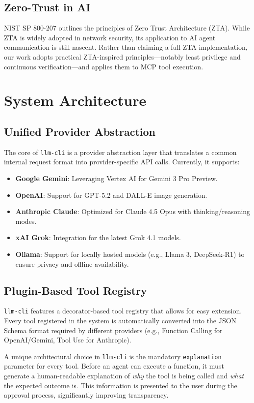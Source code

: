 \documentclass[conference]{IEEEtran}
\begin{document}
\subsection{Zero-Trust in AI}
NIST SP 800-207 \cite{nist} outlines the principles of Zero Trust Architecture (ZTA). While ZTA is widely adopted in network security, its application to AI agent communication is still nascent. Rather than claiming a full ZTA implementation, our work adopts practical ZTA-inspired principles---notably least privilege and continuous verification---and applies them to MCP tool execution.

\section{System Architecture}

\subsection{Unified Provider Abstraction}
The core of \texttt{llm-cli} is a provider abstraction layer that translates a common internal request format into provider-specific API calls. Currently, it supports:
\begin{itemize}
    \item \textbf{Google Gemini}: Leveraging Vertex AI for Gemini 3 Pro Preview.
    \item \textbf{OpenAI}: Support for GPT-5.2 and DALL-E image generation.
    \item \textbf{Anthropic Claude}: Optimized for Claude 4.5 Opus with thinking/reasoning modes.
    \item \textbf{xAI Grok}: Integration for the latest Grok 4.1 models.
    \item \textbf{Ollama}: Support for locally hosted models (e.g., Llama 3, DeepSeek-R1) to ensure privacy and offline availability.
\end{itemize}

\subsection{Plugin-Based Tool Registry}
\texttt{llm-cli} features a decorator-based tool registry that allows for easy extension. Every tool registered in the system is automatically converted into the JSON Schema format required by different providers (e.g., Function Calling for OpenAI/Gemini, Tool Use for Anthropic).

A unique architectural choice in \texttt{llm-cli} is the mandatory \texttt{explanation} parameter for every tool. Before an agent can execute a function, it must generate a human-readable explanation of \textit{why} the tool is being called and \textit{what} the expected outcome is. This information is presented to the user during the approval process, significantly improving transparency.
\end{document}
